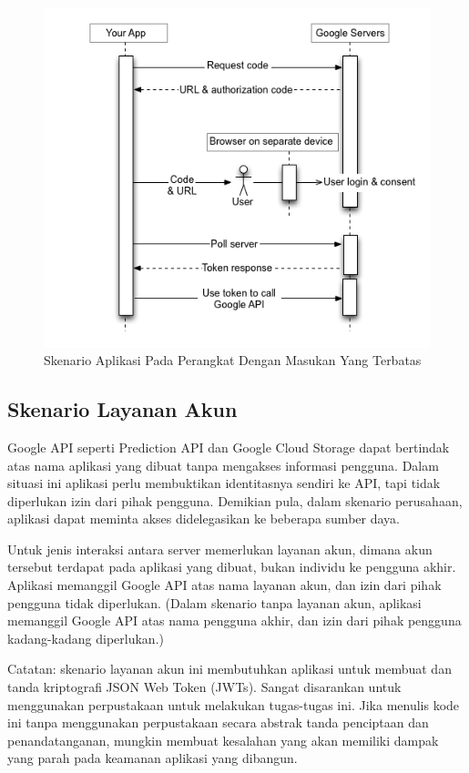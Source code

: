 \begin{figure}[H]
\centering
\includegraphics[scale=1]{Gambar/skenario3.png}
\caption[Gambar Skenario Aplikasi Pada Perangkat Dengan Masukan Yang Terbatas]{Skenario Aplikasi Pada Perangkat Dengan Masukan Yang Terbatas}
\label{fig:skenarioaplikasimasukanterbatas}
\end{figure}

\subsection{Skenario Layanan Akun}
Google API seperti Prediction API dan Google Cloud Storage dapat bertindak atas nama aplikasi yang dibuat tanpa mengakses informasi pengguna. Dalam situasi ini aplikasi perlu membuktikan identitasnya sendiri ke API, tapi tidak diperlukan izin dari pihak pengguna. Demikian pula, dalam skenario perusahaan, aplikasi dapat meminta akses didelegasikan ke beberapa sumber daya.

Untuk jenis interaksi antara server memerlukan layanan akun, dimana akun tersebut terdapat pada aplikasi yang dibuat, bukan individu ke pengguna akhir. Aplikasi memanggil Google API atas nama layanan akun, dan izin dari pihak pengguna tidak diperlukan. (Dalam skenario tanpa layanan akun, aplikasi memanggil Google API atas nama pengguna akhir, dan izin dari pihak pengguna kadang-kadang diperlukan.)

Catatan: skenario layanan akun ini membutuhkan aplikasi untuk membuat dan tanda kriptografi JSON Web Token (JWTs). Sangat disarankan untuk menggunakan perpustakaan untuk melakukan tugas-tugas ini. Jika menulis kode ini tanpa menggunakan perpustakaan secara abstrak tanda penciptaan dan penandatanganan, mungkin membuat kesalahan yang akan memiliki dampak yang parah pada keamanan aplikasi yang dibangun.

